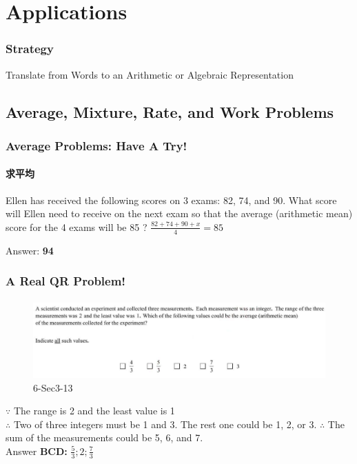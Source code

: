 \documentclass[
	11pt, %
	handout,
]{beamer}
\begin{document}

\section{Applications}


\begin{frame}
\frametitle{Strategy}
{\LARGE Translate from Words to an Arithmetic or Algebraic Representation}
\end{frame}

\subsection{Average, Mixture, Rate, and Work Problems}

\begin{frame}
	\frametitle{Average Problems: Have A Try!}
	\framesubtitle{求平均}
	Ellen has received the following scores on 3 exams: 82, 74, and 90. What score will Ellen need to receive on the next exam so that the average (arithmetic mean) score for the 4 exams will be 85 ?
	\pause
	$\frac{82 + 74 + 90 + x}{4} = 85$

	\pause
	Answer: \textbf{94}
\end{frame}


\begin{frame}
	\frametitle{A Real QR Problem!}
	\framesubtitle{}
	\begin{figure}
		\includegraphics[width=\linewidth]{Average_Example_Question1.png}
		\caption{6-Sec3-13}
	\end{figure}
	\pause
$\because$ The range is 2 and the least value is 1 \\ 
$\therefore$ Two of three integers must be 1 and 3. 
The rest one could be 1, 2, or 3.
$\therefore$ The sum of the measurements could be 5, 6, and 7.\\
\pause
\bigskip
Answer \textbf{BCD: } $\frac{5}{3};2;\frac{7}{3}$
\end{frame}
\end{document}

